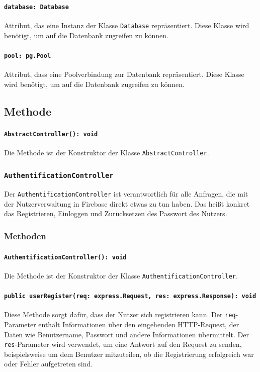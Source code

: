 \documentclass{entwurfsheft}
\begin{document}
\paragraph{\texttt{database: Database}}
Attribut, das eine Instanz der Klasse \texttt{Database} repräsentiert. Diese Klasse wird benötigt, um auf die Datenbank zugreifen zu können.
\paragraph{\texttt{pool: pg.Pool}}
Attribut, dass eine Poolverbindung zur Datenbank repräsentiert. Diese Klasse wird benötigt, um auf die Datenbank zugreifen zu können.
\subsection*{Methode}
\paragraph{\texttt{AbstractController(): void}}
Die Methode ist der Konstruktor der Klasse \texttt{AbstractController}.

\subsubsection{\texttt{AuthentificationController}}\label{sec:AuthentificationController}
Der \texttt{AuthentificationController} ist verantwortlich für alle Anfragen, die mit der Nutzerverwaltung in Firebase direkt etwas zu tun haben. Das heißt konkret das Registrieren, Einloggen und Zurücksetzen des Passwort des Nutzers.
\subsubsection*{Methoden}
\paragraph{\texttt{AuthentificationController(): void}}
Die Methode ist der Konstruktor der Klasse \texttt{AuthentificationController}.
\paragraph{\texttt{public userRegister(req: express.Request, res: express.Response): void}}
Diese Methode sorgt dafür, dass der Nutzer sich registrieren kann. Der \texttt{req}-Parameter enthält Informationen über den eingehenden HTTP-Request, der Daten wie Benutzername, Passwort und andere Informationen übermittelt. Der \texttt{res}-Parameter wird verwendet, um eine Antwort auf den Request zu senden, beispielsweise um dem Benutzer mitzuteilen, ob die Registrierung erfolgreich war oder Fehler aufgetreten sind.
\end{document}

